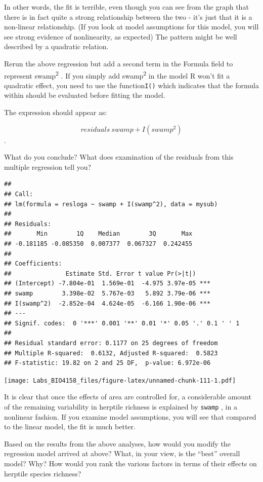 \documentclass[
  12pt,
]{book}
\makeatletter
\newenvironment{kframe}{%
\medskip{}
\setlength{\fboxsep}{.8em}
\def\at@end@of@kframe{}%
\ifinner\ifhmode%
 \def\at@end@of@kframe{\end{minipage}}%
 \begin{minipage}{\columnwidth}%
\fi\fi%
\def\FrameCommand##1{\hskip\@totalleftmargin \hskip-\fboxsep
\colorbox{incolor}{##1}\hskip-\fboxsep
    \hskip-\linewidth \hskip-\@totalleftmargin \hskip\columnwidth}%
\MakeFramed {\advance\hsize-\width
  \@totalleftmargin\z@ \linewidth\hsize
  \@setminipage}}%
{\par\unskip\endMakeFramed%
\at@end@of@kframe}
\newenvironment{rmdblock}[1]
 {
 \begin{itemize}
 \renewcommand{\labelitemi}{
   \raisebox{-.7\height}[0pt][0pt]{
     {\setkeys{Gin}{width=3em,keepaspectratio}\texttt{[image: images/\#1]}}
   }
 }
 \begin{kframe}
 \setlength{\fboxsep}{1em}
 \item
 }
 {
 \end{kframe}
 \end{itemize}
 }
\newenvironment{rmdcode}
  {\begin{rmdblock}{screen}}
  {\end{rmdblock}}
\makeatother
\begin{document}
In other words, the fit is terrible, even though you can see from the graph that there is in fact quite a strong relationship between the two - it's just that it is a non-linear relationship. (If you look at model assumptions for this model, you will see strong evidence of nonlinearity, as expected) The pattern might be well described by a quadratic relation.

\begin{rmdcode}
Rerun the above regression but add a second term in the Formula field to represent swamp\textsuperscript{2} . If you simply add swamp\textsuperscript{2} in the model R won't fit a quadratic effect, you need to use the function\texttt{I()} which indicates that the formula within should be evaluated before fitting the model.

The expression should appear as:

\[ residuals ~ swamp + I(swamp^2)\].

What do you conclude? What does examination of the residuals from this multiple regression tell you?
\end{rmdcode}

\begin{verbatim}
## 
## Call:
## lm(formula = resloga ~ swamp + I(swamp^2), data = mysub)
## 
## Residuals:
##       Min        1Q    Median        3Q       Max 
## -0.181185 -0.085350  0.007377  0.067327  0.242455 
## 
## Coefficients:
##               Estimate Std. Error t value Pr(>|t|)    
## (Intercept) -7.804e-01  1.569e-01  -4.975 3.97e-05 ***
## swamp        3.398e-02  5.767e-03   5.892 3.79e-06 ***
## I(swamp^2)  -2.852e-04  4.624e-05  -6.166 1.90e-06 ***
## ---
## Signif. codes:  0 '***' 0.001 '**' 0.01 '*' 0.05 '.' 0.1 ' ' 1
## 
## Residual standard error: 0.1177 on 25 degrees of freedom
## Multiple R-squared:  0.6132, Adjusted R-squared:  0.5823 
## F-statistic: 19.82 on 2 and 25 DF,  p-value: 6.972e-06
\end{verbatim}

\texttt{[image: Labs\_BIO4158\_files/figure-latex/unnamed-chunk-111-1.pdf]}

It is clear that once the effects of area are controlled for, a considerable amount of the remaining variability in herptile richness is explained by \texttt{swamp} , in a nonlinear fashion. If you examine model assumptions, you will see that compared to the linear model, the fit is much better.

Based on the results from the above analyses, how would you modify the regression model arrived at above? What, in your view, is the ``best'' overall model? Why? How would you rank the various factors in terms of their effects on herptile species richness?
\end{document}
